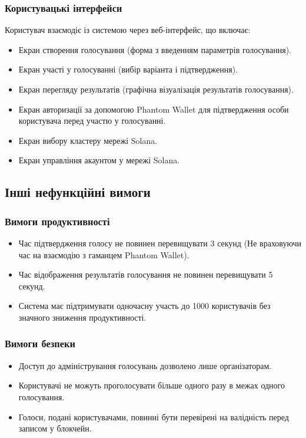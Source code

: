 \documentclass[14pt]{extreport}
\begin{document}
  \subsubsection{Користувацькі інтерфейси}
  Користувач взаємодіє із системою через веб-інтерфейс, що включає:
  \begin{itemize}
    \item Екран створення голосування (форма з введенням параметрів голосування).
    \item Екран участі у голосуванні (вибір варіанта і підтвердження).
    \item Екран перегляду результатів (графічна візуалізація результатів голосування).
    \item Екран авторизації за допомогою Phantom Wallet для підтвердження особи користувача перед участю у голосуванні.
    \item Екран вибору кластеру мережі Solana.
    \item Екран управління акаунтом у мережі Solana.
  \end{itemize}
  
  \subsection{Інші нефункційні вимоги}
  \subsubsection{Вимоги продуктивності}
  \begin{itemize}
    \item Час підтвердження голосу не повинен перевищувати 3 секунд (Не враховуючи час на взаємодію з гаманцем Phantom Wallet).
    \item Час відображення результатів голосування не повинен перевищувати 5 секунд.  
    \item Система має підтримувати одночасну участь до 1000 користувачів без значного зниження продуктивності.  
  \end{itemize}

  \subsubsection{Вимоги безпеки}
  \begin{itemize}
    \item Доступ до адміністрування голосувань дозволено лише організаторам.
    \item Користувачі не можуть проголосувати більше одного разу в межах одного голосування.
    \item Голоси, подані користувачами, повинні бути перевірені на валідність перед записом у блокчейн.
  \end{itemize}
  
\end{document}
